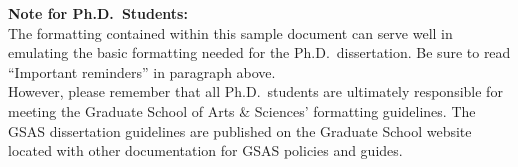 \begin{extranotespage}
\begin{singlespace}
{ \textbf{Note for Ph.D.\ Students:}} \\
The formatting contained within this sample document can serve well in
emulating the basic formatting needed for the Ph.D.\ dissertation.  Be sure to
read ``Important reminders'' in paragraph above.\\ However, please remember
that all Ph.D.\ students are ultimately responsible for meeting the Graduate
School of Arts \& Sciences' formatting guidelines.  The GSAS dissertation
guidelines are published on the Graduate School website located with other
documentation for GSAS policies and guides.

\end{singlespace}
\end{extranotespage}

\begin{thesiscopyrightpage}                 %
\end{thesiscopyrightpage}


